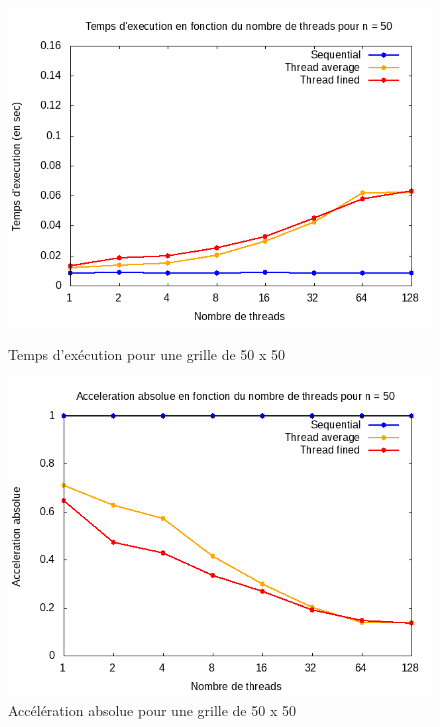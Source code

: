 \documentclass[10pt,a4paper]{article}
\begin{document}
\begin{figure}[!tbp]
  \centering
  \begin{minipage}[b]{0.49\textwidth}
	\includegraphics[width=\textwidth]{./Time/size_50_time.png}
    \caption{Temps d'exécution pour une grille de 50 x 50}
  \end{minipage}
  \hfill
  \begin{minipage}[b]{0.49\textwidth}
    \includegraphics[width=\textwidth]{./Time/size_50_acceleration.png}
    \caption{Accélération absolue pour une grille de 50 x 50}
  \end{minipage}
\end{figure}
\end{document}

